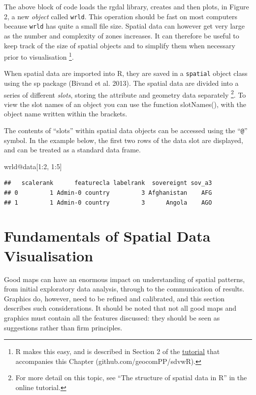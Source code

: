 \documentclass[]{article}
\newenvironment{Shaded}{}{}
\newcommand{\DecValTok}[1]{\textcolor[rgb]{0.25,0.63,0.44}{{#1}}}
\newcommand{\NormalTok}[1]{{#1}}
\begin{document}
The above block of code loads the rgdal library, creates and then plots, in Figure 2, a new
\emph{object} called \texttt{wrld}. This operation should be fast on most computers because
\texttt{wrld} has quite a small file size. Spatial data can however get very large as the number and complexity of zones increases. It can therefore be useful to keep track of the size of spatial objects and to
simplify them when necessary prior to visualisation \footnote{R makes this easy, and is described in Section
2 of the
\href{https://github.com/geocomPP/sdvwR/blob/master/sdv-tutorial.pdf?raw=true}{tutorial}
that accompanies this Chapter (github.com/geocomPP/sdvwR).
}.

When spatial data are imported into R, they are saved in a
\texttt{spatial} object class using the sp package (Bivand et al.
2013). The spatial data are divided into a series of different
\emph{slots}, storing the attribute and geometry data separately \footnote{For more detail on this
topic, see ``The structure of spatial data in R'' in the online
tutorial.}. To view the slot names of an object you can use the function slotNames(), with the object name written within the brackets.

The contents of ``slots'' within spatial data objects can be accessed using the ``\texttt{@}'' symbol. In the example below, the first two rows of the data slot are displayed, and can be treated as a standard data frame.


\begin{Shaded}
\begin{Highlighting}[]
\NormalTok{wrld@data[}\DecValTok{1}\NormalTok{:}\DecValTok{2}\NormalTok{, }\DecValTok{1}\NormalTok{:}\DecValTok{5}\NormalTok{]}
\end{Highlighting}
\end{Shaded}
\begin{verbatim}
##   scalerank      featurecla labelrank  sovereignt sov_a3
## 0         1 Admin-0 country         3 Afghanistan    AFG
## 1         1 Admin-0 country         3      Angola    AGO
\end{verbatim}

\section{Fundamentals of Spatial Data Visualisation}

Good maps can have an enormous impact on understanding of spatial patterns, 
from initial exploratory data analysis, through to the communication of results.
Graphics do, however, need to be refined and calibrated, and this section describes
such considerations. It should be
noted that not all good maps and graphics must
contain all the features discussed: they should be seen as suggestions
rather than firm principles.
\end{document}
